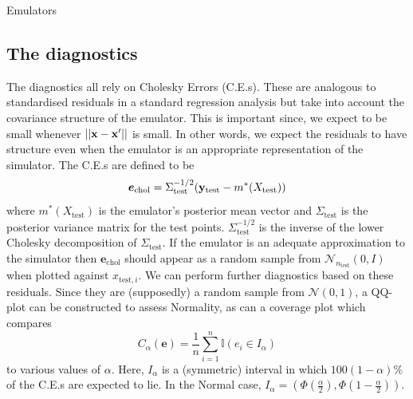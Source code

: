 \begin{chapter}{Emulators \label{Ch:Emulators}}
\subsection{The diagnostics}
The diagnostics all rely on Cholesky Errors (C.E.s). These are analogous to standardised residuals in a standard regression analysis but take into account the covariance structure of the emulator. This is important since, we expect  to be small whenever $||\mathbf{x} - \mathbf{x}'||$ is small. In other words, we expect the residuals to have structure even when the emulator is an appropriate representation of the simulator. The C.E.s are defined to be
\begin{equation}
  \bm{e}_{\text{chol}} = \Sigma_\text{test}^{-1/2}(\mathbf{y}_{\text{test}} - m^{*}(X_{\text{test}}))
\end{equation}
where $m^*(X_{\text{test}})$ is the emulator's posterior mean vector and $\Sigma_\text{test}$ is the posterior variance matrix for the test points. $\Sigma^{-1/2}_\text{test}$ is the inverse of the lower Cholesky decomposition of $\Sigma_\text{test}$. If the emulator is an adequate approximation to the simulator then $\bm{e}_\text{chol}$ should appear as a random sample from $\mathcal{N}_{n_\text{test}}(0, I)$ when plotted against $x_{\text{test},i}$. We can perform further diagnostics based on these residuals. Since they are (supposedly) a random sample from $\mathcal{N}(0,1)$, a QQ-plot can be constructed to assess Normality, as can a coverage plot which compares
\begin{equation}
  C_\alpha (\bm{e}) = \frac{1}{n}\sum_{i=1}^n \mathbb{I} ( e_i \in I_{\alpha})
\end{equation}
to various values of $\alpha$. Here, $I_\alpha$ is a (symmetric) interval in which $100(1-\alpha)\%$ of the C.E.s are expected to lie. In the Normal case, $I_\alpha = \left( \Phi(\frac{\alpha}{2}), \Phi (1 - \frac{\alpha}{2}) \right)$.

\end{chapter}
